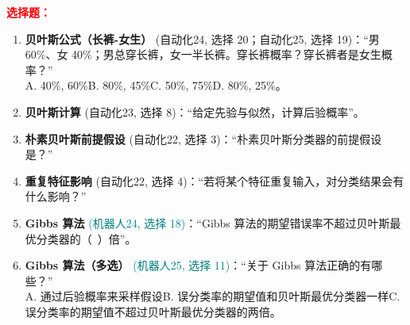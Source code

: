 ﻿\documentclass[../main.tex]{subfiles}
\begin{document}
\noindent\textbf{\textcolor{red}{选择题：}}
\begin{enumerate}[itemsep=0.45em, topsep=0.2em, leftmargin=1.5em]
    \item \textbf{贝叶斯公式（长裤-女生）} \textcolor{autoclassgreen}{(自动化24, 选择 20；自动化25, 选择 19)}：``男 60\%、女 40\%；男总穿长裤，女一半长裤。穿长裤概率？穿长裤者是女生概率？''\\
    A. 40\%, 60\%\quad B. 80\%, 45\%\quad C. 50\%, 75\%\quad D. 80\%, 25\%。 

    \item \textbf{贝叶斯计算} \textcolor{autoclassgreen}{(自动化23, 选择 8)}：``给定先验与似然，计算后验概率''。\\
     

    \item \textbf{朴素贝叶斯前提假设} \textcolor{autoclassgreen}{(自动化22, 选择 3)}：``朴素贝叶斯分类器的前提假设是？''\\
     

    \item \textbf{重复特征影响} \textcolor{autoclassgreen}{(自动化22, 选择 4)}：``若将某个特征重复输入，对分类结果会有什么影响？''\\
     

    \item \textbf{Gibbs 算法} \textcolor{teal}{(机器人24, 选择 18)}：``Gibbs 算法的期望错误率不超过贝叶斯最优分类器的（\ ）倍''。\\
     

    \item \textbf{Gibbs 算法（多选）} \textcolor{teal}{(机器人25, 选择 11)}：``关于 Gibbs 算法正确的有哪些？''\\
    A. 通过后验概率来采样假设\quad B. 误分类率的期望值和贝叶斯最优分类器一样\quad C. 误分类率的期望值不超过贝叶斯最优分类器的两倍\quad {}。 


\end{enumerate}
\end{document}
